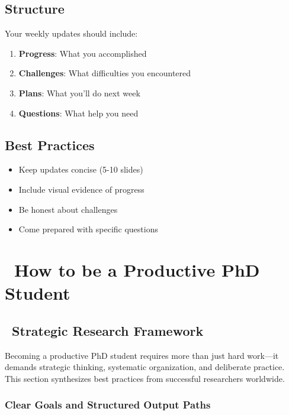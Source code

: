 \documentclass[11pt,a4paper]{article}
\begin{document}
\subsection{Structure}
Your weekly updates should include:
\begin{enumerate}
    \item \textbf{Progress}: What you accomplished
    \item \textbf{Challenges}: What difficulties you encountered
    \item \textbf{Plans}: What you'll do next week
    \item \textbf{Questions}: What help you need
\end{enumerate}

\subsection{Best Practices}
\begin{itemize}
    \item Keep updates concise (5-10 slides)
    \item Include visual evidence of progress
    \item Be honest about challenges
    \item Come prepared with specific questions
\end{itemize}

\newpage


\newpage

\section{\faRocket~How to be a Productive PhD Student}

\subsection{\faCompass~Strategic Research Framework}

\begin{tcolorbox}[colback=blue!5,colframe=darkblue,title=The Foundation of PhD Success]
Becoming a productive PhD student requires more than just hard work—it demands strategic thinking, systematic organization, and deliberate practice. This section synthesizes best practices from successful researchers worldwide.
\end{tcolorbox}

\subsubsection{Clear Goals and Structured Output Paths}
\end{document}
